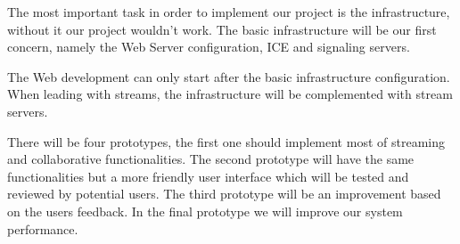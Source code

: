 
The most important task in order to implement our project is the infrastructure, without it our project wouldn't work. The basic infrastructure will be our first concern, namely the Web Server configuration, ICE and signaling servers. 

The Web development can only start after the basic infrastructure configuration. When leading with streams, the infrastructure will be complemented with stream servers.

There will be four prototypes, the first one should implement most of streaming and collaborative functionalities. The second prototype will have the same functionalities but a more friendly user interface which will be tested and reviewed by potential users. The third prototype will be an improvement based on the users feedback. In the final prototype we will improve our system performance. 



